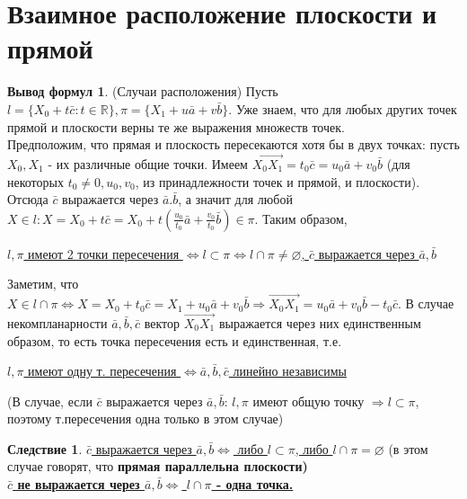 \documentclass[a4paper, 12pt]{article}
\theoremstyle{definition}
\newtheorem*{consequense}{Следствие}
\newtheorem*{formulas}{Вывод формул}
\begin{document}
	\section{Взаимное расположение плоскости и прямой}
	\begin{formulas}(Случаи расположения)
		Пусть $l = \{X_0 + t\bar{c}: t \in \mathbb{R}\}, \pi = \{X_1 + u\bar{a} + v\bar{b}\}$. Уже знаем, что для любых других точек прямой и плоскости верны те же выражения множеств точек. \\
		Предположим, что прямая и плоскость пересекаются хотя бы в двух точках: пусть $X_0, X_1$ - их различные общие точки. Имеем $\overrightarrow{X_0X_1} = t_0\bar{c} = u_0\bar{a} + v_0\bar{b}$ (для некоторых $t_0 \neq 0, u_0, v_0$, из принадлежности точек и прямой, и плоскости). Отсюда $\bar{c}$ выражается через $\bar{a}. \bar{b}$, а значит для любой $X \in l: X = X_0 + t\bar{c} = X_0 + t(\frac{u_0}{t_0}\bar{a} + \frac{v_0}{t_0}\bar{b}) \in \pi$. Таким образом, 
		\begin{center}\underline{
			$l,\pi$ имеют 2 точки пересечения $\Leftrightarrow l \subset \pi \Leftrightarrow l \cap \pi \neq \varnothing$, $\bar{c}$ выражается через $\bar{a}, \bar{b}$}
		\end{center}
		Заметим, что $X \in l \cap \pi \Leftrightarrow X = X_0 + t_0\bar{c} = X_1 + u_0\bar{a} + v_0\bar{b} \Rightarrow \overrightarrow{X_0X_1} = u_0\bar{a} + v_0\bar{b} - t_0\bar{c}$. В случае некомпланарности $\bar{a}, \bar{b}, \bar{c}$ вектор $\overrightarrow{X_0X_1}$ выражается через них единственным образом, то есть точка пересечения есть и единственная, т.е.
		\begin{center}\underline{
		$l, \pi$ имеют одну т. пересечения $\Leftrightarrow \bar{a}, \bar{b}, \bar{c}$ линейно независимы}
		\end{center}
		(В случае, если $\bar{c}$ выражается через $\bar{a}, \bar{b}$: $l, \pi$ имеют общую точку $\Rightarrow l \subset \pi$, поэтому т.пересечения одна только в этом случае)
	\end{formulas}
	\begin{consequense}
		\underline{$\bar{c}$ выражается через $\bar{a}, \bar{b} \Leftrightarrow$ либо $l\subset\pi$, либо $l\cap\pi=\varnothing$} (в этом случае говорят, что \bfseries прямая параллельна плоскости\mdseries)\\
		\underline{$\bar{c}$ не выражается через $\bar{a}, \bar{b} \Leftrightarrow$ $l\cap\pi$ - одна точка.}
	\end{consequense}
\end{document}

